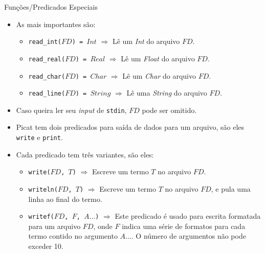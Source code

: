 \begin{frame}[c,allowframebreaks]{Funções/Predicados Especiais}
\begin{itemize}
        \item As mais importantes são:
        
        \begin{itemize}
            
            \item \texttt{read\_int($FD$) = $Int$} $\Rightarrow$ Lê um \textit{Int} do 
            arquivo $FD$.
            
            \item \texttt{read\_real($FD$) = $Real$} $\Rightarrow$ Lê um \textit{Float} do 
            arquivo $FD$.
            
            \item \texttt{read\_char($FD$) = $Char$} $\Rightarrow$ Lê um \textit{Char} do 
            arquivo $FD$.
            
            \item \texttt{read\_line($FD$) = $String$} $\Rightarrow$ Lê uma \textit{String} 
            do arquivo $FD$.
            
        \end{itemize}
        
        \item Caso queira ler seu \textit{input} de \texttt{stdin}, $FD$ pode ser omitido.
        
        \framebreak
        
        \item Picat tem dois predicados para saída de dados para um arquivo, são eles 
        \texttt{write} e \texttt{print}.
        
        \item Cada predicado tem três variantes, são eles:
        
        \begin{itemize}
            
            \item \texttt{write($FD$, $T$)} $\Rightarrow$ Escreve um termo $T$ no arquivo 
            $FD$.
            
            \item \texttt{writeln($FD$, $T$)} $\Rightarrow$ Escreve um termo $T$ no arquivo 
            $FD$, e pula uma linha ao final do termo.
            
            \item \texttt{writef($FD$, $F$, $A\ldots$)} $\Rightarrow$ Este predicado é usado 
            para escrita formatada para um arquivo $FD$, onde $F$ indica uma série de 
            formatos para cada termo contido no argumento $A\ldots$. O número de argumentos 
            não pode exceder 10.
            

\end{itemize}
\end{itemize}
\end{frame}
